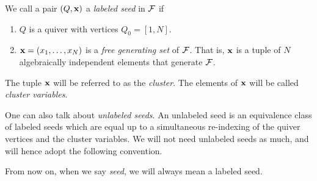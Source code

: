 \begin{definition}
	We call a pair $(Q, \mathbf{x})$ a \emph{labeled seed} in $\mathcal{F}$ if
	\begin{enumerate}
		\item $Q$ is a quiver with vertices $Q_0 = [1, N]$.
		\item $\mathbf{x} = (x_1, \dots, x_N)$ is a \emph{free generating set} of $\mathcal{F}$. That is, $\mathbf{x}$ is a tuple of $N$ algebraically independent elements that generate $\mathcal{F}$.
	\end{enumerate}
	The tuple $\mathbf{x}$ will be referred to as the \emph{cluster}. The elements of $\mathbf{x}$ will be called \emph{cluster variables}.
\end{definition}
%
One can also talk about \emph{unlabeled seeds}. An unlabeled seed
is an equivalence class of labeled seeds which are equal up to a simultaneous
re-indexing of the quiver vertices and the cluster variables. We will not need
unlabeled seeds as much, and will hence adopt the following convention.
\begin{convention}
	From now on, when we say \emph{seed}, we will always mean a labeled seed.
\end{convention}

